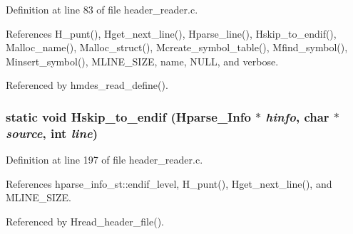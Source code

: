 Definition at line 83 of file header\_\-reader.c.

References H\_\-punt(), Hget\_\-next\_\-line(), Hparse\_\-line(), Hskip\_\-to\_\-endif(), Malloc\_\-name(), Malloc\_\-struct(), Mcreate\_\-symbol\_\-table(), Mfind\_\-symbol(), Minsert\_\-symbol(), MLINE\_\-SIZE, name, NULL, and verbose.

Referenced by hmdes\_\-read\_\-define().
\subsubsection{\setlength{\rightskip}{0pt plus 5cm}static void Hskip\_\-to\_\-endif (\bf{Hparse\_\-Info} $\ast$ {\em hinfo}, char $\ast$ {\em source}, int {\em line})\hspace{0.3cm}{\tt  [static]}}\label{header__reader_8c_f63b46bd1c5165e8ffdcc5823217d55f}




Definition at line 197 of file header\_\-reader.c.

References hparse\_\-info\_\-st::endif\_\-level, H\_\-punt(), Hget\_\-next\_\-line(), and MLINE\_\-SIZE.

Referenced by Hread\_\-header\_\-file().